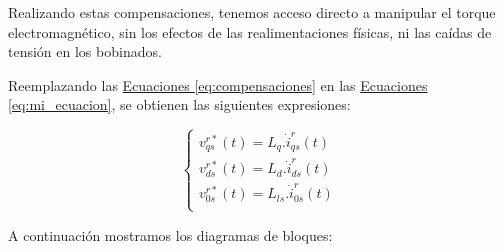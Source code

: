 \documentclass{article}
\begin{document}
Realizando estas compensaciones, tenemos acceso directo a manipular el torque electromagnético, 
sin los efectos de las realimentaciones físicas, ni las caídas de tensión en los bobinados.

Reemplazando las \hyperref[eq:compensaciones]{Ecuaciones \ref*{eq:compensaciones}} en las
\hyperref[eq:mi_ecuacion]{Ecuaciones \ref*{eq:mi_ecuacion}}, se obtienen las siguientes expresiones:

\begin{equation}\label{eq:proporcionlaidad_corrientes_tensiones_de_entrada}
    \begin{cases}
        v^{r*}_{qs}(t) = L_q. \dot{i}_{qs}^r(t) \\
        v^{r*}_{ds}(t) = L_d. \dot{i}_{ds}^r(t) \\
        v^{r*}_{0s}(t) = L_{ls}. \dot{i}_{0s}^r(t) \\
    \end{cases}
\end{equation}

A continuación mostramos los diagramas de bloques: 
\end{document}
